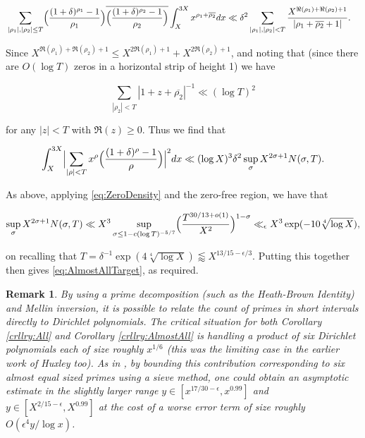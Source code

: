 \documentclass{amsart}
\theoremstyle{plain}
\newtheorem*{rmk}{Remark}
\numberwithin{equation}{section}
\begin{document}
\begin{align*}
&\sum_{|\rho_1|,|\rho_2|\le T}\Bigl(\frac{(1+\delta)^{\rho_1}-1}{\rho_1}\Bigr)\overline{\Bigl(\frac{(1+\delta)^{\rho_2}-1}{\rho_2}\Bigr)}\int_X^{3X}x^{\rho_1+\overline{\rho_2}}dx\ll \delta^2\sum_{|\rho_1|,|\rho_2|<T}\frac{X^{\Re(\rho_1)+\Re(\rho_2)+1}}{|\rho_1+\overline{\rho_2}+1|}.
\end{align*}

Since $X^{\Re(\rho_1)+\Re(\rho_2)+1}\le X^{2\Re(\rho_1)+1}+X^{2\Re(\rho_2)+1}$, and noting that (since there are $O(\log{T})$ zeros in a horizontal strip of height 1) we have

\[
\sum_{|\rho_2|<T} |1+z+\overline{\rho_2}|^{-1}\ll (\log{T})^2
\]

 for any $|z|<T$ with $\Re(z)\ge 0$. Thus we find that

\[
\int_X^{3X} \Bigl| \sum_{|\rho|<T}x^\rho\Bigl(\frac{(1+\delta)^\rho-1}{\rho}\Bigr)\Bigr|^2dx\ll (\log{X})^3 \delta^2\sup_{\sigma} X^{2\sigma+1}N(\sigma,T).
\]

As above, applying \eqref{eq:ZeroDensity} and the zero-free region, we have that

\[
\sup_{\sigma} X^{2\sigma+1}N(\sigma,T)\ll X^3\sup_{\sigma \le 1-c(\log{T})^{-5/7}}\Bigl(\frac{T^{30/13+o(1)}}{X^2}\Bigr)^{1-\sigma}\ll_\epsilon X^3\exp(-10\sqrt[4]{\log{X}}),
\]

on recalling that $T=\delta^{-1}\exp(4\sqrt[4]{\log{X}})\lessapprox X^{13/15-\epsilon/3}$. Putting this together then gives \eqref{eq:AlmostAllTarget}, as required.



\begin{rmk}
By using a prime decomposition (such as the Heath-Brown Identity) and Mellin inversion, it is possible to relate the count of primes in short intervals directly to Dirichlet polynomials. The critical situation for both Corollary \ref{crllry:All} and Corollary \ref{crllry:AlmostAll} is handling a product of six Dirichlet polynomials each of size roughly $x^{1/6}$ (this was the limiting case in the earlier work of Huxley \cite{Hu} too). As in \cite{HB4}, by bounding this contribution corresponding to six almost equal sized primes using a sieve method, one could obtain an asymptotic estimate in the slightly larger range $y\in[x^{17/30-\epsilon},x^{0.99}]$ and $y\in [X^{2/15-\epsilon},X^{0.99}]$ at the cost of a worse error term of size roughly $O(\epsilon^4 y/\log{x})$.
\end{rmk}


%
%
%
%
\end{document}
